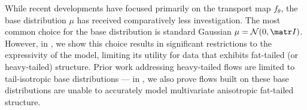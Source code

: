 \documentclass{article}
\theoremstyle{definition}
\theoremstyle{remark}
\begin{document}
While recent developments \citep{chen2019residual,huang2018neural,durkan2019neural} have focused primarily
on the transport map $f_\theta$, the base distribution $\mu$ has received comparatively less investigation. 
The most common choice for the base distribution is standard Gaussian $\mu = \cN(0,\mI)$.
However, in , we show this choice results in significant
restrictions to the expressivity of the model, limiting its utility for data that
exhibits fat-tailed (or heavy-tailed) structure.
Prior work addressing heavy-tailed flows \citep{jaini2020tails}
are limited to tail-isotropic base distributions ---
in , we also prove flows built on these base distributions
are unable to accurately model multivariate anisotropic fat-tailed structure.
\end{document}
